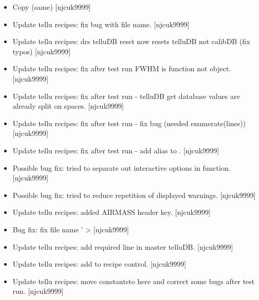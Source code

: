\documentclass[a4paper,10pt,english]{report}
\begin{document}
\label{\detokenize{misc/changelog:id390}}\begin{itemize}
\item {} 
Copy (same) {[}njcuk9999{]}

\item {} 
Update tellu recipes: fix bug with file name. {[}njcuk9999{]}

\item {} 
Update tellu recipes: drs telluDB reset now resets telluDB not calibDB
(fix typos) {[}njcuk9999{]}

\item {} 
Update tellu recipes: fix after test run FWHM is function not object.
{[}njcuk9999{]}

\item {} 
Update tellu recipes: fix after test run - telluDB get database values
are already split on spaces. {[}njcuk9999{]}

\item {} 
Update tellu recipes: fix after test run - fix bug (needed
enumerate(lines)) {[}njcuk9999{]}

\item {} 
Update tellu recipes: fix after test run - add alias to
. {[}njcuk9999{]}

\item {} 
Possible bug fix: tried to separate out interactive options in
 function. {[}njcuk9999{]}

\item {} 
Possible bug fix: tried to reduce repetition of displayed warnings.
{[}njcuk9999{]}

\item {} 
Update tellu recipes: added AIRMASS header key. {[}njcuk9999{]}

\item {} 
Bug fix: fix file name ’ \textendash{}\textgreater{}
 {[}njcuk9999{]}

\item {} 
Update tellu recipes: add required line in master telluDB. {[}njcuk9999{]}

\item {} 
Update tellu recipes: add  to recipe control.
{[}njcuk9999{]}

\item {} 
Update tellu recipes: move  constantsto here and
correct some bugs after test run. {[}njcuk9999{]}


\end{itemize}
\end{document}
